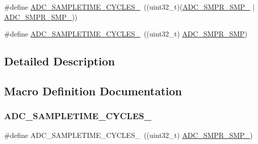 \begin{DoxyCompactItemize}
\item 
\#define \hyperlink{group___a_d_c__sampling__times_ga15c48307b1f2aed2a1c3c6338c13b070}{A\+D\+C\+\_\+\+S\+A\+M\+P\+L\+E\+T\+I\+M\+E\+\_\+C\+Y\+C\+L\+E\+S\+\_}~((uint32\+\_\+t)(\hyperlink{group___peripheral___registers___bits___definition_ga046d9b1e209acb9e7152db85c8b7bcce}{A\+D\+C\+\_\+\+S\+M\+P\+R\+\_\+\+S\+M\+P\+\_} $\vert$ \hyperlink{group___peripheral___registers___bits___definition_gab57bf329f4bf7c460f3666ea37dc7221}{A\+D\+C\+\_\+\+S\+M\+P\+R\+\_\+\+S\+M\+P\+\_}))
\item 
\#define \hyperlink{group___a_d_c__sampling__times_ga7172f3d957445df5b98648b25ccc64d4}{A\+D\+C\+\_\+\+S\+A\+M\+P\+L\+E\+T\+I\+M\+E\+\_\+C\+Y\+C\+L\+E\+S\+\_}~((uint32\+\_\+t) \hyperlink{group___peripheral___registers___bits___definition_gaceac2124a2a41388f9f5e5c2c310a27e}{A\+D\+C\+\_\+\+S\+M\+P\+R\+\_\+\+S\+MP})
\end{DoxyCompactItemize}


\subsection{Detailed Description}


\subsection{Macro Definition Documentation}
\mbox{\label{group___a_d_c__sampling__times_ga96ddc2c8f5aec56ef5b6dc7cf908842a}} 
\subsubsection{\texorpdfstring{A\+D\+C\+\_\+\+S\+A\+M\+P\+L\+E\+T\+I\+M\+E\+\_\+C\+Y\+C\+L\+E\+S\+\_}{ADC\_SAMPLETIME\_13CYCLES\_5}}
{\footnotesize\ttfamily \#define A\+D\+C\+\_\+\+S\+A\+M\+P\+L\+E\+T\+I\+M\+E\+\_\+C\+Y\+C\+L\+E\+S\+\_~((uint32\+\_\+t) \hyperlink{group___peripheral___registers___bits___definition_gab57bf329f4bf7c460f3666ea37dc7221}{A\+D\+C\+\_\+\+S\+M\+P\+R\+\_\+\+S\+M\+P\+\_})}

